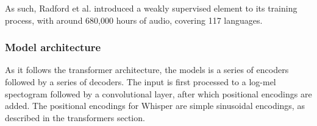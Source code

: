 As such, Radford et al. introduced a weakly supervised element to its training process, with around 680,000 hours of audio, covering 117 languages.

\subsubsection{Model architecture}

As it follows the transformer architecture, the models is a series of encoders followed by a series of decoders. The input is first processed to a log-mel spectogram followed by a convolutional layer, after which positional encodings are added. The positional encodings for Whisper are simple sinusoidal encodings, as described in the transformers section.

